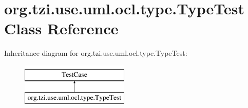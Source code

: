 \hypertarget{classorg_1_1tzi_1_1use_1_1uml_1_1ocl_1_1type_1_1_type_test}{\section{org.\-tzi.\-use.\-uml.\-ocl.\-type.\-Type\-Test Class Reference}
\label{classorg_1_1tzi_1_1use_1_1uml_1_1ocl_1_1type_1_1_type_test}
}
Inheritance diagram for org.\-tzi.\-use.\-uml.\-ocl.\-type.\-Type\-Test\-:\begin{figure}[H]
\begin{center}
\leavevmode
\includegraphics[height=2.000000cm]{classorg_1_1tzi_1_1use_1_1uml_1_1ocl_1_1type_1_1_type_test}
\end{center}
\end{figure}

